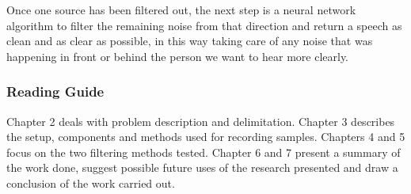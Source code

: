 Once one source has been filtered out, the next step is a neural network algorithm to filter the remaining 
noise from that direction and return a speech as clean and as clear as possible, in this way taking care of 
any noise that was happening in front or behind the person we want to hear more clearly.
\subsubsection{Reading Guide}
Chapter 2 deals with problem description and delimitation. 
Chapter 3 describes the setup, components and methods used for recording samples.
Chapters 4 and 5 focus on the two filtering methods tested. Chapter 6 and 
7 present a summary of the work done, suggest possible future uses of the research 
presented and draw a conclusion of the work carried out.
